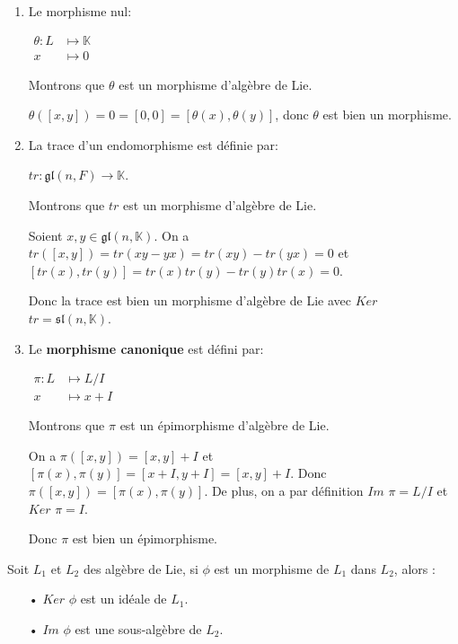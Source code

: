 \documentclass[a4paper,openany,12pt]{report}
\newcommand{\KK}{\mathbb{K}}
\newcommand{\gl}{\mathfrak{gl}}
\newcommand{\ssl}{\mathfrak{sl}}
\theoremstyle{break}
{\theorembodyfont{\upshape}
\newtheorem*{rmq}{Remarque :}
\newtheorem*{prv}{Preuve :}
\newtheorem*{ex}{Exemples :}
\newtheorem*{exe}{Exemple : }
\newtheorem*{nota}{Notation :}
\newtheorem*{dem}{D\'emonstration :}}
\begin{document}
\begin{ex}
\begin{enumerate}

\item Le morphisme nul:
\begin{center} 
$\begin{aligned} \theta: L & \longmapsto \KK \\ x & \longmapsto 0 \end{aligned}$
\end{center}
Montrons que $\theta$ est un morphisme d'algèbre de Lie.

$\theta([x,y]) = 0 = [0,0] = [\theta(x),\theta(y)]$, donc $\theta$ est bien un morphisme.

\item La trace d'un endomorphisme est définie par: 
\begin{center}
$tr: \gl(n,F) \longrightarrow \KK$.
\end{center}
Montrons que $tr$ est un morphisme d’algèbre de Lie.

Soient $x,y \in  \gl(n,\KK)$. On a $tr([x,y]) = tr(xy-yx) = tr(xy)-tr(yx) = 0$
et $[tr(x),tr(y)] = tr(x)tr(y)-tr(y)tr(x) = 0$.

Donc la trace est bien un morphisme d'algèbre de Lie avec $Ker$ $tr = \ssl(n,\KK)$.

\item Le \textbf{morphisme canonique} est défini par:  
\begin{center}
$\begin{aligned} \pi: L & \longmapsto L/I \\ x & \longmapsto x+I\end{aligned}$
\end{center}
Montrons que $\pi$ est un épimorphisme d'algèbre de Lie.

On a $\pi([x,y]) = [x,y]+I$ et $[\pi(x),\pi(y)] = [x+I,y+I] = [x,y]+I$. Donc $\pi([x,y]) = [\pi(x),\pi(y)]$. De plus, on a par définition $Im$ $\pi = L/I$ et $Ker$ $\pi = I$.

Donc $\pi$ est bien un épimorphisme.
\end{enumerate}
\end{ex}

\begin{rmq}
\quad Soit $L_{1}$ et $L_{2}$ des algèbre de Lie, si $\phi$ est un morphisme de $L_{1}$ dans $L_{2}$, alors :
\begin{itemize}
\item[•] $Ker$ $\phi$ est un idéale de $L_{1}$.
\item[•] $Im$ $\phi$ est une sous-algèbre de $L_{2}$.
\end{itemize}
\end{rmq}
\end{document}
